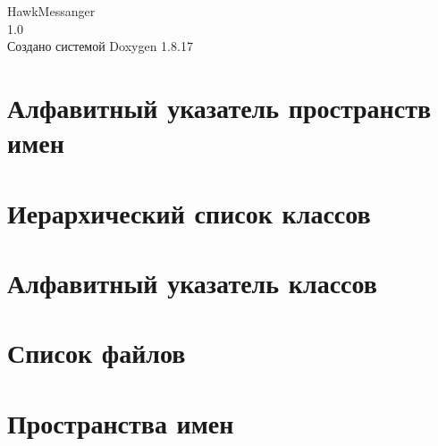 \let\mypdfximage\pdfximage\def\pdfximage{\immediate\mypdfximage}\documentclass[twoside]{book}
\newcommand{\+}{\discretionary{\mbox{\scriptsize$\hookleftarrow$}}{}{}}
\newcommand{\clearemptydoublepage}{%
  \newpage{\pagestyle{empty}\cleardoublepage}%
}
\begin{document}
\hypersetup{pageanchor=false,
             bookmarksnumbered=true,
             pdfencoding=unicode
            }
\begin{titlepage}
\vspace*{7cm}
\begin{center}%
{\Large Hawk\+Messanger \\[1ex]\large 1.\+0 }\\
\vspace*{1cm}
{\large Создано системой Doxygen 1.8.17}\\
\end{center}
\end{titlepage}
\clearemptydoublepage
{}
\tableofcontents
\clearemptydoublepage
{}
\hypersetup{pageanchor=true}

\chapter{Алфавитный указатель пространств имен}

\chapter{Иерархический список классов}

\chapter{Алфавитный указатель классов}

\chapter{Список файлов}

\chapter{Пространства имен}






\end{document}
